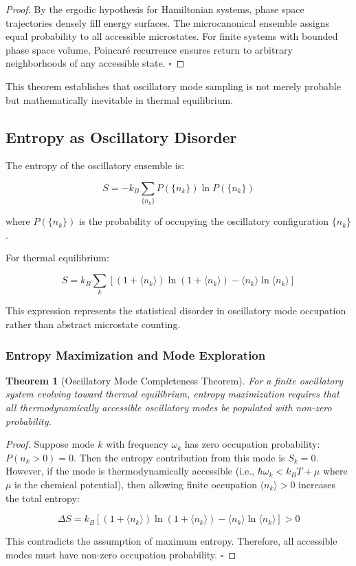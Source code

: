 \documentclass[11pt]{article}
\newtheorem{theorem}{Theorem}[section]
\theoremstyle{remark}
\begin{document}
\begin{proof}
By the ergodic hypothesis for Hamiltonian systems, phase space trajectories densely fill energy surfaces. The microcanonical ensemble assigns equal probability to all accessible microstates. For finite systems with bounded phase space volume, Poincaré recurrence ensures return to arbitrary neighborhoods of any accessible state. $\square$
\end{proof}

This theorem establishes that oscillatory mode sampling is not merely probable but mathematically inevitable in thermal equilibrium.

\subsection{Entropy as Oscillatory Disorder}

The entropy of the oscillatory ensemble is:

$$S = -k_B \sum_{\{n_k\}} P(\{n_k\}) \ln P(\{n_k\})$$

where $P(\{n_k\})$ is the probability of occupying the oscillatory configuration $\{n_k\}$.

For thermal equilibrium:

$$S = k_B \sum_k \left[(1 + \langle n_k\rangle)\ln(1 + \langle n_k\rangle) - \langle n_k\rangle\ln\langle n_k\rangle\right]$$

This expression represents the statistical disorder in oscillatory mode occupation rather than abstract microstate counting.

\subsubsection{Entropy Maximization and Mode Exploration}

\begin{theorem}[Oscillatory Mode Completeness Theorem]
For a finite oscillatory system evolving toward thermal equilibrium, entropy maximization requires that all thermodynamically accessible oscillatory modes be populated with non-zero probability.
\end{theorem}

\begin{proof}
Suppose mode $k$ with frequency $\omega_k$ has zero occupation probability: $P(n_k > 0) = 0$. Then the entropy contribution from this mode is $S_k = 0$. However, if the mode is thermodynamically accessible (i.e., $\hbar\omega_k < k_BT + \mu$ where $\mu$ is the chemical potential), then allowing finite occupation $\langle n_k\rangle > 0$ increases the total entropy:

$$\Delta S = k_B[(1 + \langle n_k\rangle)\ln(1 + \langle n_k\rangle) - \langle n_k\rangle\ln\langle n_k\rangle] > 0$$

This contradicts the assumption of maximum entropy. Therefore, all accessible modes must have non-zero occupation probability. $\square$
\end{proof}
\end{document}
